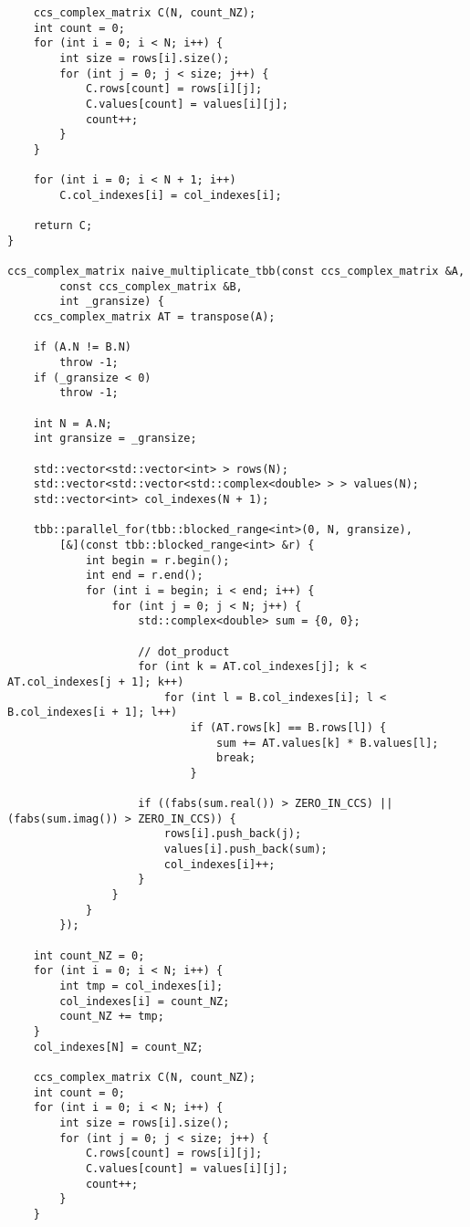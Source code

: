 \documentclass{report}
\begin{document}
\begin{itemize}
\begin{itemize}
\begin{lstlisting}
    ccs_complex_matrix C(N, count_NZ);
    int count = 0;
    for (int i = 0; i < N; i++) {
        int size = rows[i].size();
        for (int j = 0; j < size; j++) {
            C.rows[count] = rows[i][j];
            C.values[count] = values[i][j];
            count++;
        }
    }

    for (int i = 0; i < N + 1; i++)
        C.col_indexes[i] = col_indexes[i];

    return C;
}

ccs_complex_matrix naive_multiplicate_tbb(const ccs_complex_matrix &A,
        const ccs_complex_matrix &B,
        int _gransize) {
    ccs_complex_matrix AT = transpose(A);

    if (A.N != B.N)
        throw -1;
    if (_gransize < 0)
        throw -1;

    int N = A.N;
    int gransize = _gransize;

    std::vector<std::vector<int> > rows(N);
    std::vector<std::vector<std::complex<double> > > values(N);
    std::vector<int> col_indexes(N + 1);

    tbb::parallel_for(tbb::blocked_range<int>(0, N, gransize),
        [&](const tbb::blocked_range<int> &r) {
            int begin = r.begin();
            int end = r.end();
            for (int i = begin; i < end; i++) {
                for (int j = 0; j < N; j++) {
                    std::complex<double> sum = {0, 0};

                    // dot_product
                    for (int k = AT.col_indexes[j]; k < AT.col_indexes[j + 1]; k++)
                        for (int l = B.col_indexes[i]; l < B.col_indexes[i + 1]; l++)
                            if (AT.rows[k] == B.rows[l]) {
                                sum += AT.values[k] * B.values[l];
                                break;
                            }

                    if ((fabs(sum.real()) > ZERO_IN_CCS) || (fabs(sum.imag()) > ZERO_IN_CCS)) {
                        rows[i].push_back(j);
                        values[i].push_back(sum);
                        col_indexes[i]++;
                    }
                }
            }
        });

    int count_NZ = 0;
    for (int i = 0; i < N; i++) {
        int tmp = col_indexes[i];
        col_indexes[i] = count_NZ;
        count_NZ += tmp;
    }
    col_indexes[N] = count_NZ;

    ccs_complex_matrix C(N, count_NZ);
    int count = 0;
    for (int i = 0; i < N; i++) {
        int size = rows[i].size();
        for (int j = 0; j < size; j++) {
            C.rows[count] = rows[i][j];
            C.values[count] = values[i][j];
            count++;
        }
    }


\end{lstlisting}
\end{itemize}
\end{itemize}
\end{document}
